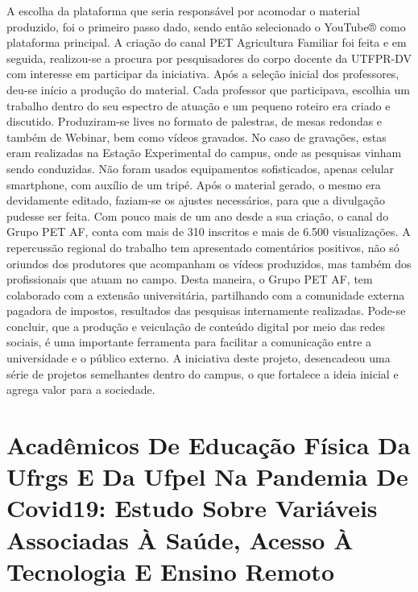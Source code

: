 A escolha da plataforma que seria responsável por acomodar o material produzido, foi o 
primeiro passo dado, sendo então selecionado o YouTube® como plataforma principal. A criação 
do canal PET Agricultura Familiar foi feita e em seguida, realizou-se a procura por 
pesquisadores do corpo docente da UTFPR-DV com interesse em participar da iniciativa. Após a 
seleção inicial dos professores, deu-se início a produção do material. 
Cada professor que participava, escolhia um trabalho dentro do seu espectro de atuação e 
um pequeno roteiro era criado e discutido. Produziram-se lives no formato de palestras, de mesas 
redondas e também de Webinar, bem como vídeos gravados. No caso de gravações, estas eram
realizadas na Estação Experimental do campus, onde as pesquisas vinham sendo conduzidas. Não 
foram usados equipamentos sofisticados, apenas celular smartphone, com auxílio de um tripé.
Após o material gerado, o mesmo era devidamente editado, faziam-se os ajustes 
necessários, para que a divulgação pudesse ser feita.
Com pouco mais de um ano desde a sua criação, o canal do Grupo PET AF, conta com 
mais de 310 inscritos e mais de 6.500 visualizações. A repercussão regional do trabalho tem
apresentado comentários positivos, não só oriundos dos produtores que acompanham os vídeos 
produzidos, mas também dos profissionais que atuam no campo. Desta maneira, o Grupo PET AF, 
tem colaborado com a extensão universitária, partilhando com a comunidade externa pagadora de 
impostos, resultados das pesquisas internamente realizadas.
Pode-se concluir, que a produção e veiculação de conteúdo digital por meio das redes 
sociais, é uma importante ferramenta para facilitar a comunicação entre a universidade e o público 
externo. A iniciativa deste projeto, desencadeou uma série de projetos semelhantes dentro do 
campus, o que fortalece a ideia inicial e agrega valor para a sociedade.




\section*{Acadêmicos De Educação Física Da Ufrgs E Da Ufpel Na Pandemia De Covid19: Estudo Sobre Variáveis Associadas À Saúde, Acesso À Tecnologia E Ensino Remoto }

